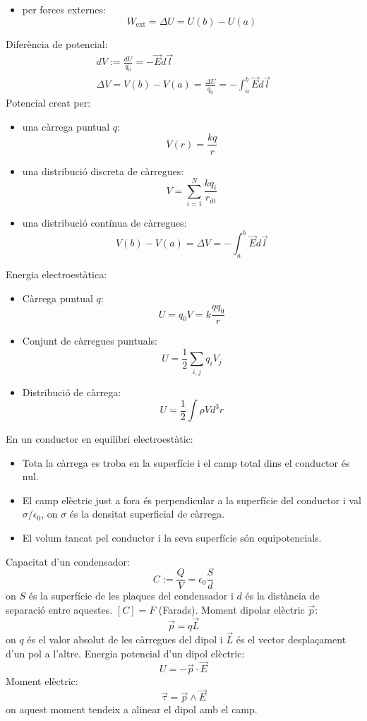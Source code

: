 \documentclass[class=article,10pt,crop=false]{standalone}
\begin{document}
\begin{multicols}{2}
\begin{itemize}
    \item per forces externes: $$W_{\text{ext}}=\Delta U=U(b)-U(a)$$
\end{itemize}
Diferència de potencial:
\begin{gather*}
    dV:=\frac{dU}{q_0}=-\Vec{E}d\Vec{l}\\
    \Delta V=V(b)-V(a)=\frac{\Delta U}{q_0}=-\int_a^b\Vec{E}d\Vec{l}
\end{gather*}
Potencial creat per:
\begin{itemize}
    \item una càrrega puntual $q$: $$V(r)=\frac{kq}{r}$$
    \item una distribució discreta de càrregues: $$V=\sum_{i=1}^N\frac{kq_i}{r_{i0}}$$
    \item una distribució contínua de càrregues:
    $$V(b)-V(a)=\Delta V=-\int_a^b\Vec{E}d\Vec{l}$$
\end{itemize}
Energia electroestàtica:
\begin{itemize}
    \item Càrrega puntual $q$:$$U=q_0V=k\frac{qq_0}{r}$$
    \item Conjunt de càrregues puntuals: $$U=\frac{1}{2}\sum_{i,j}q_iV_j$$
    \item Distribució de càrrega:
    $$U=\frac{1}{2}\int\rho V d^3r$$
\end{itemize}
En un conductor en equilibri electroestàtic:
\begin{itemize}
    \item Tota la càrrega es troba en la superfície i el camp total dins el conductor és nul.
    \item El camp elèctric just a fora és per\-pen\-di\-cu\-lar a la superfície del conductor i val $\sigma/\epsilon_0$, on $\sigma$ és la densitat superficial de càrrega.
    \item El volum tancat pel conductor i la seva superfície són equipotencials.
\end{itemize}
Capacitat d'un condensador: $$C:=\frac{Q}{V}=\epsilon_0\frac{S}{d}$$ {on $S$ és la superfície de les plaques del condensador i $d$ és la distància de separació entre aquestes. $[C]=F$ (Farads).}\newline
Moment dipolar elèctric $\Vec{p}$: $$\Vec{p}=q\Vec{L}$$ {on $q$ és el valor absolut de les càrregues del dipol i $\Vec{L}$ és el vector desplaçament d'un pol a l'altre.}\newline
Energia potencial d'un dipol elèctric: $$U=-\Vec{p}\cdot\Vec{E}$$
Moment elèctric: $$\Vec{\tau}=\Vec{p}\wedge\Vec{E}$$ {on aquest moment tendeix a alinear el dipol amb el camp.}\newline

\end{multicols}
\end{document}
